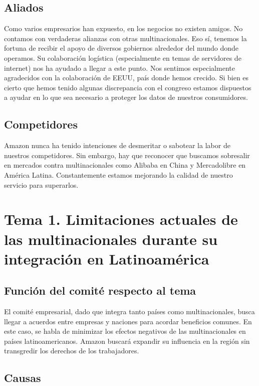 \documentclass[11pt,a4paper]{article}
\begin{document}
\subsection{Aliados}

\noindent Como varios empresarios han expuesto, en los negocios no existen amigos. No contamos con verdaderas alianzas con otras multinacionales. Eso sí, tenemos la fortuna de recibir el apoyo de diversos gobiernos alrededor del mundo donde operamos. Su colaboración logística (especialmente en temas de servidores de internet) nos ha ayudado a llegar a este punto. Nos sentimos especialmente agradecidos con la colaboración de EEUU, país donde hemos crecido. Si bien es cierto que hemos tenido algunas discrepancia con el congreso \cite{sundar} estamos dispuestos a ayudar en lo que sea necesario a proteger los datos de nuestros consumidores.

\subsection{Competidores}

\noindent Amazon nunca ha tenido intenciones de desmeritar o sabotear la labor de nuestros competidores. Sin embargo, hay que reconocer que buscamos sobresalir en mercados contra multinacionales como Alibaba en China y Mercadolibre en América Latina. Constantemente estamos mejorando la calidad de nuestro servicio para superarlos.

\section{Tema 1. Limitaciones actuales de las multinacionales durante su integración en Latinoamérica }

\subsection{Función del comité respecto al tema}

\noindent El comité empresarial, dado que integra tanto países como multinacionales, busca llegar a acuerdos entre empresas y naciones para acordar beneficios comunes. En este caso, se habla de minimizar los efectos negativos de las multinacionales en países latinoamericanos. Amazon buscará expandir su influencia en la región sin transgredir los derechos de los trabajadores. 

\subsection{Causas}
\end{document}
